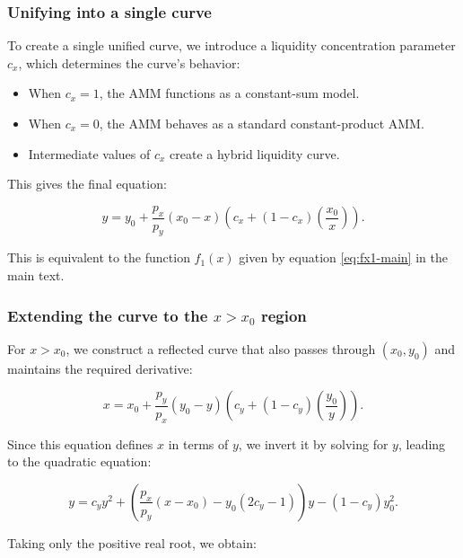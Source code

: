 \documentclass{article}
\begin{document}
\subsubsection{Unifying into a single curve}

To create a single unified curve, we introduce a liquidity concentration parameter \( c_x \), which determines the curve’s behavior:

\begin{itemize}
    \item When \( c_x = 1 \), the AMM functions as a constant-sum model.
    \item When \( c_x = 0 \), the AMM behaves as a standard constant-product AMM.
    \item Intermediate values of \( c_x \) create a hybrid liquidity curve.
\end{itemize}

This gives the final equation:

\begin{equation}
    \label{eq:maglev-1}
    y = y_0 + \frac{p_x}{p_y} (x_0 - x) \left( c_x + (1 - c_x) \left(\frac{x_0}{x}\right) \right).
\end{equation}

This is equivalent to the function \( f_1(x) \) given by equation \eqref{eq:fx1-main} in the main text.

\subsubsection{Extending the curve to the \( x > x_0 \) region}

For \( x > x_0 \), we construct a reflected curve that also passes through \( (x_0, y_0) \) and maintains the required derivative:

\begin{equation}
    \label{eq:maglev-3-inverse}
    x = x_0 + \frac{p_y}{p_x} (y_0 - y) \left( c_y + (1 - c_y) \left(\frac{y_0}{y}\right) \right).
\end{equation}

Since this equation defines \( x \) in terms of \( y \), we invert it by solving for \( y \), leading to the quadratic equation:

\begin{equation}
    y = c_y y^2 + \left( \frac{p_x}{p_y} (x - x_0) - y_0(2c_y - 1) \right)y - (1 - c_y) y_0^2.
\end{equation}

Taking only the positive real root, we obtain:
\end{document}
